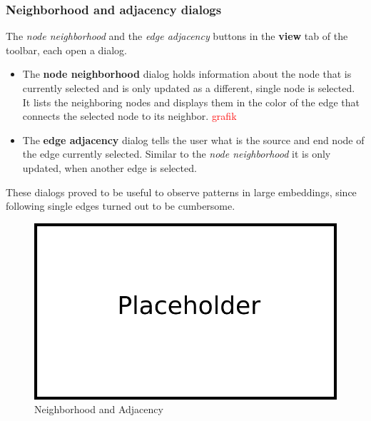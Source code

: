 \subsubsection{Neighborhood and adjacency dialogs}
The \textit{node neighborhood} and the \textit{edge adjacency} buttons in the \textbf{view} tab of the toolbar, each open a dialog. \\
\begin{itemize}
\item The \textbf{node neighborhood} dialog holds information about the node that is currently selected and is only updated as a different, single node is selected. It lists the neighboring nodes and displays them in the color of the edge that connects the selected node to its neighbor.
\textcolor{red}{grafik}
\item The \textbf{edge adjacency} dialog tells the user what is the source and end node of the edge currently selected. Similar to the \textit{node neighborhood} it is only updated, when another edge is selected.
\end{itemize}
These dialogs proved to be useful to observe patterns in large embeddings, since following single edges turned out to be cumbersome.
\begin{figure}[!h]
\begin{center}
\includegraphics[width=1\textwidth]{figures/Platzhalter.png}
\caption{Neighborhood and Adjacency}
\label{img:plzhltr}
\end{center}
\end{figure}

